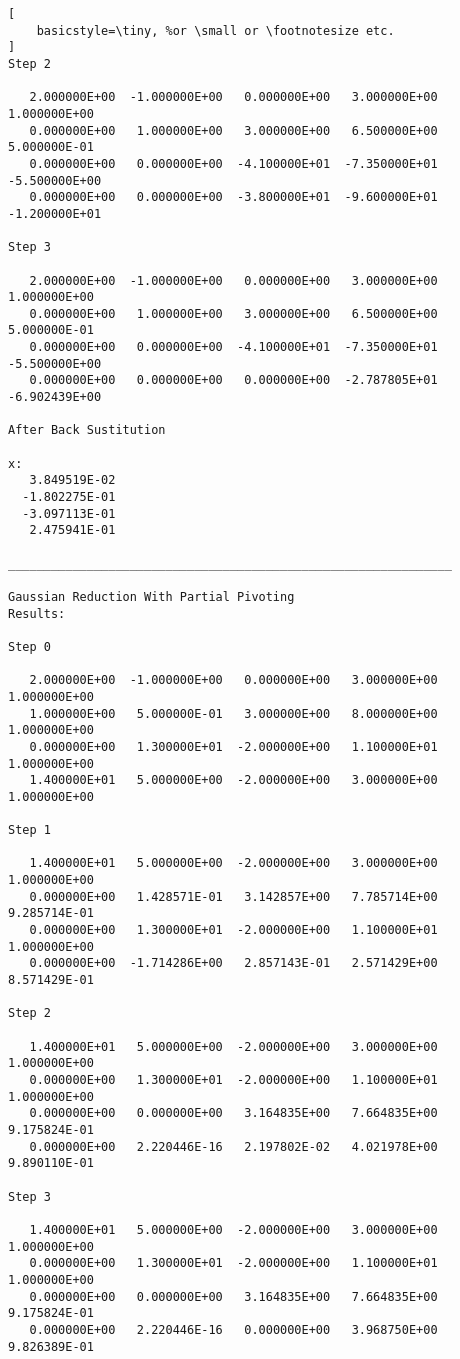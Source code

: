 \documentclass{article}
\begin{document}
\begin{lstlisting}[
    basicstyle=\tiny, %or \small or \footnotesize etc.
]
Step 2

   2.000000E+00  -1.000000E+00   0.000000E+00   3.000000E+00   1.000000E+00
   0.000000E+00   1.000000E+00   3.000000E+00   6.500000E+00   5.000000E-01
   0.000000E+00   0.000000E+00  -4.100000E+01  -7.350000E+01  -5.500000E+00
   0.000000E+00   0.000000E+00  -3.800000E+01  -9.600000E+01  -1.200000E+01

Step 3

   2.000000E+00  -1.000000E+00   0.000000E+00   3.000000E+00   1.000000E+00
   0.000000E+00   1.000000E+00   3.000000E+00   6.500000E+00   5.000000E-01
   0.000000E+00   0.000000E+00  -4.100000E+01  -7.350000E+01  -5.500000E+00
   0.000000E+00   0.000000E+00   0.000000E+00  -2.787805E+01  -6.902439E+00

After Back Sustitution

x:
   3.849519E-02
  -1.802275E-01
  -3.097113E-01
   2.475941E-01

______________________________________________________________

Gaussian Reduction With Partial Pivoting
Results:

Step 0

   2.000000E+00  -1.000000E+00   0.000000E+00   3.000000E+00   1.000000E+00
   1.000000E+00   5.000000E-01   3.000000E+00   8.000000E+00   1.000000E+00
   0.000000E+00   1.300000E+01  -2.000000E+00   1.100000E+01   1.000000E+00
   1.400000E+01   5.000000E+00  -2.000000E+00   3.000000E+00   1.000000E+00

Step 1

   1.400000E+01   5.000000E+00  -2.000000E+00   3.000000E+00   1.000000E+00
   0.000000E+00   1.428571E-01   3.142857E+00   7.785714E+00   9.285714E-01
   0.000000E+00   1.300000E+01  -2.000000E+00   1.100000E+01   1.000000E+00
   0.000000E+00  -1.714286E+00   2.857143E-01   2.571429E+00   8.571429E-01

Step 2

   1.400000E+01   5.000000E+00  -2.000000E+00   3.000000E+00   1.000000E+00
   0.000000E+00   1.300000E+01  -2.000000E+00   1.100000E+01   1.000000E+00
   0.000000E+00   0.000000E+00   3.164835E+00   7.664835E+00   9.175824E-01
   0.000000E+00   2.220446E-16   2.197802E-02   4.021978E+00   9.890110E-01

Step 3

   1.400000E+01   5.000000E+00  -2.000000E+00   3.000000E+00   1.000000E+00
   0.000000E+00   1.300000E+01  -2.000000E+00   1.100000E+01   1.000000E+00
   0.000000E+00   0.000000E+00   3.164835E+00   7.664835E+00   9.175824E-01
   0.000000E+00   2.220446E-16   0.000000E+00   3.968750E+00   9.826389E-01


\end{lstlisting}
\end{document}
